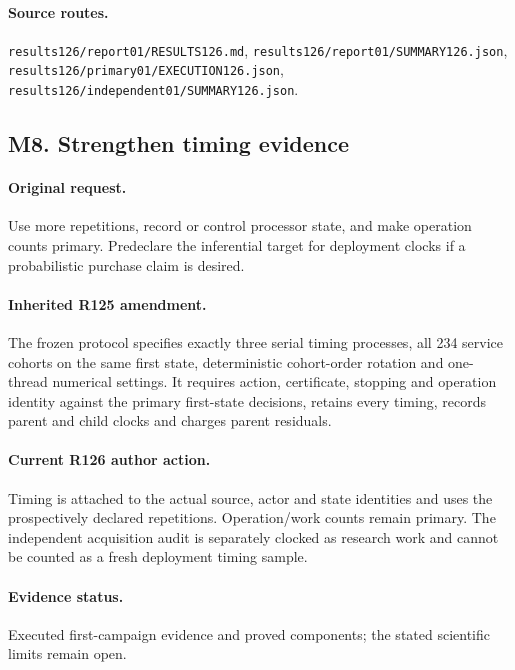 \paragraph{Source routes.} \nolinkurl{results126/report01/RESULTS126.md}, \nolinkurl{results126/report01/SUMMARY126.json}, \nolinkurl{results126/primary01/EXECUTION126.json}, \nolinkurl{results126/independent01/SUMMARY126.json}.

\subsection*{M8. Strengthen timing evidence}
\paragraph{Original request.} Use more repetitions, record or control processor state, and make operation counts primary. Predeclare the inferential target for deployment clocks if a probabilistic purchase claim is desired.

\paragraph{Inherited R125 amendment.} The frozen protocol specifies exactly three serial timing processes, all 234 service cohorts on the same first state, deterministic cohort-order rotation and one-thread numerical settings. It requires action, certificate, stopping and operation identity against the primary first-state decisions, retains every timing, records parent and child clocks and charges parent residuals.

\paragraph{Current R126 author action.} Timing is attached to the actual source, actor and state identities and uses the prospectively declared repetitions. Operation/work counts remain primary. The independent acquisition audit is separately clocked as research work and cannot be counted as a fresh deployment timing sample.

\paragraph{Evidence status.} Executed first-campaign evidence and proved components; the stated scientific limits remain open.

